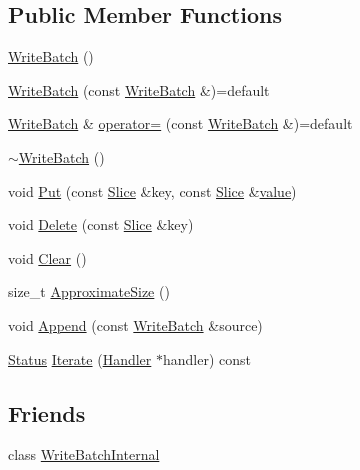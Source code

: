 \subsection*{Public Member Functions}
\begin{DoxyCompactItemize}
\item 
\mbox{\hyperlink{classleveldb_1_1_write_batch_a5287eda973cfd100149a034c871dcc44}{Write\+Batch}} ()
\item 
\mbox{\hyperlink{classleveldb_1_1_write_batch_a61a12adbdb41477fbdc8a0c74fb09cad}{Write\+Batch}} (const \mbox{\hyperlink{classleveldb_1_1_write_batch}{Write\+Batch}} \&)=default
\item 
\mbox{\hyperlink{classleveldb_1_1_write_batch}{Write\+Batch}} \& \mbox{\hyperlink{classleveldb_1_1_write_batch_a049aee5405c91cb9e56bd26bd098f51d}{operator=}} (const \mbox{\hyperlink{classleveldb_1_1_write_batch}{Write\+Batch}} \&)=default
\item 
\mbox{\hyperlink{classleveldb_1_1_write_batch_a5bc7decc31279f2457839b30ad8daca5}{$\sim$\+Write\+Batch}} ()
\item 
void \mbox{\hyperlink{classleveldb_1_1_write_batch_a30770379143a7ccb4ede18ddf0e45bf3}{Put}} (const \mbox{\hyperlink{classleveldb_1_1_slice}{Slice}} \&key, const \mbox{\hyperlink{classleveldb_1_1_slice}{Slice}} \&\mbox{\hyperlink{version__set_8cc_a38c8b88c432e666ad10b0c5573e1160a}{value}})
\item 
void \mbox{\hyperlink{classleveldb_1_1_write_batch_a473da7f94483dab253cc36b7b231ce53}{Delete}} (const \mbox{\hyperlink{classleveldb_1_1_slice}{Slice}} \&key)
\item 
void \mbox{\hyperlink{classleveldb_1_1_write_batch_afd5058344dc9be113919a5110129006f}{Clear}} ()
\item 
size\+\_\+t \mbox{\hyperlink{classleveldb_1_1_write_batch_ab6fef29a45e54ede38138dea327b8051}{Approximate\+Size}} ()
\item 
void \mbox{\hyperlink{classleveldb_1_1_write_batch_a90424a9947fb7501eec2c31acf96e27f}{Append}} (const \mbox{\hyperlink{classleveldb_1_1_write_batch}{Write\+Batch}} \&source)
\item 
\mbox{\hyperlink{classleveldb_1_1_status}{Status}} \mbox{\hyperlink{classleveldb_1_1_write_batch_a64278020155c37619bfe007840bb2d23}{Iterate}} (\mbox{\hyperlink{classleveldb_1_1_write_batch_1_1_handler}{Handler}} $\ast$handler) const
\end{DoxyCompactItemize}
\subsection*{Friends}
\begin{DoxyCompactItemize}
\item 
class \mbox{\hyperlink{classleveldb_1_1_write_batch_a0c491f15816190f8235ccd1367d5ae5f}{Write\+Batch\+Internal}}
\end{DoxyCompactItemize}


